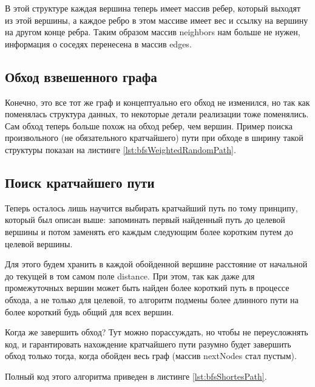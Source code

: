 \documentclass[../article.tex]{subfiles}
\begin{document}
В этой структуре каждая вершина теперь имеет массив ребер, который выходят из этой вершины, а каждое ребро в этом массиве имеет вес и ссылку на вершину на другом конце ребра. Таким образом массив {\firacodebold neighbors} нам больше не нужен, информация о соседях перенесена в массив {\firacodebold edges}.

\subsection{Обход взвешенного графа}

Конечно, это все тот же граф и концептуально его обход не изменился, но так как поменялась структура данных, то некоторые детали реализации тоже поменялись. Сам обход теперь больше похож на обход ребер, чем вершин. Пример поиска произвольного (не обязательного кратчайшего) пути при обходе в ширину такой структуры показан на листинге \ref{lst:bfsWeightedRandomPath}.

\subsection{Поиск кратчайшего пути}

Теперь осталось лишь научится выбирать кратчайший путь по тому принципу, который был описан выше: запоминать первый найденный путь до целевой вершины и потом заменять его каждым следующим более коротким путем до целевой вершины.

Для этого будем хранить в каждой обойденной вершине расстояние от начальной до текущей в том самом поле {\firacodebold distance}. При этом, так как даже для промежуточных вершин может быть найден более короткий путь в процессе обхода, а не только для целевой, то алгоритм подмены более длинного пути на более короткий будь общий для всех вершин.

Когда же завершить обход? Тут можно порассуждать, но чтобы не переусложнять код, и гарантировать нахождение кратчайшего пути разумно будет завершить обход только тогда, когда обойден весь граф (массив {\firacodebold nextNodes} стал пустым).

Полный код этого алгоритма приведен в листинге \ref{lst:bfsShortesPath}.
\end{document}
